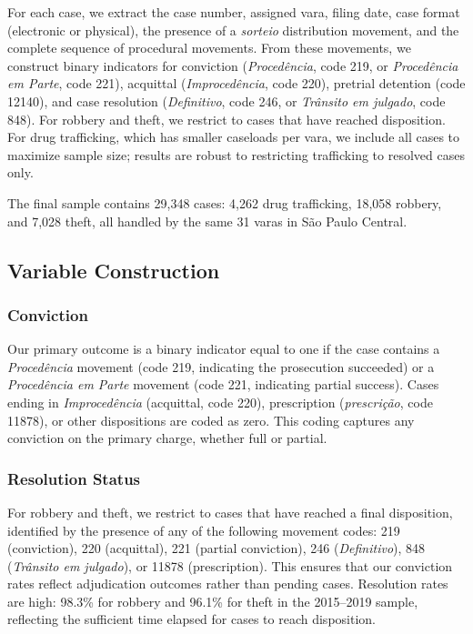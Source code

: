 \documentclass[12pt]{article}
\begin{document}
For each case, we extract the case number, assigned vara, filing date, case format (electronic or physical), the presence of a \textit{sorteio} distribution movement, and the complete sequence of procedural movements. From these movements, we construct binary indicators for conviction (\textit{Proced\^encia}, code 219, or \textit{Proced\^encia em Parte}, code 221), acquittal (\textit{Improced\^encia}, code 220), pretrial detention (code 12140), and case resolution (\textit{Definitivo}, code 246, or \textit{Tr\^ansito em julgado}, code 848). For robbery and theft, we restrict to cases that have reached disposition. For drug trafficking, which has smaller caseloads per vara, we include all cases to maximize sample size; results are robust to restricting trafficking to resolved cases only.

The final sample contains 29,348 cases: 4,262 drug trafficking, 18,058 robbery, and 7,028 theft, all handled by the same 31 varas in S\~ao Paulo Central.

\subsection{Variable Construction}

\subsubsection*{Conviction} Our primary outcome is a binary indicator equal to one if the case contains a \textit{Proced\^encia} movement (code 219, indicating the prosecution succeeded) or a \textit{Proced\^encia em Parte} movement (code 221, indicating partial success). Cases ending in \textit{Improced\^encia} (acquittal, code 220), prescription (\textit{prescri\c{c}\~ao}, code 11878), or other dispositions are coded as zero. This coding captures any conviction on the primary charge, whether full or partial.

\subsubsection*{Resolution Status} For robbery and theft, we restrict to cases that have reached a final disposition, identified by the presence of any of the following movement codes: 219 (conviction), 220 (acquittal), 221 (partial conviction), 246 (\textit{Definitivo}), 848 (\textit{Tr\^ansito em julgado}), or 11878 (prescription). This ensures that our conviction rates reflect adjudication outcomes rather than pending cases. Resolution rates are high: 98.3\% for robbery and 96.1\% for theft in the 2015--2019 sample, reflecting the sufficient time elapsed for cases to reach disposition.
\end{document}
